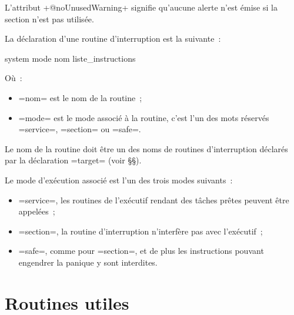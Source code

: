 
L'attribut \plm+@noUnusedWarning+ signifie qu'aucune alerte n'est émise si la section n'est pas utilisée.





















La déclaration d'une routine d'interruption est la suivante~:
\begin{PLM}
system mode nom {
  liste_instructions
}
\end{PLM}
Où~:
\begin{itemize}
  \item \plm=nom= est le nom de la routine~;
  \item \plm=mode= est le mode associé à la routine, c'est l'un des mots réservés \plm=service=, \plm=section= ou \plm=safe=.
\end{itemize}

Le nom de la routine doit être un des noms de routines d'interruption déclarés par la déclaration \plm=target= (voir §§).

Le mode d'exécution associé est l'un des trois modes suivants~:
\begin{itemize}
  \item \plm=service=, les routines de l'exécutif rendant des tâches prêtes peuvent être appelées~;
  \item \plm=section=, la routine d'interruption n'interfère pas avec l'exécutif~;
  \item \plm=safe=, comme pour \plm=section=, et de plus les instructions pouvant engendrer la panique y sont interdites.
\end{itemize}









\section{Routines utiles}

